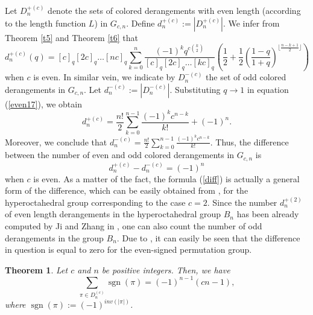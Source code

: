 \documentclass[a4paper,12pt]{article}
\newtheorem{thm}{Theorem}[section]
\begin{document}
Let $D_n^{+(c)}$ denote the sets of colored derangements with even length (according to the length function $L$) in $G_{c,n}$. Define $d_n^{+(c)}:=|D_n^{+(c)}|$. We infer from Theorem \ref{t5} and Theorem \ref{t6} that 
\begin{equation}\label{even17}
   d_n^{+(c)}(q)=[c]_q[2c]_q\dots [nc]_q \sum_{k=0}^n \frac{(-1)^k q^{c \binom{k}{2}}}{[c]_q[2c]_q\dots [kc]_q} \left( \frac{1}{2}+\frac{1}{2}\left( \frac{1-q}{1+q}\right)^{\lfloor{\frac{n-k+1}{2}}\rfloor}\right) 
\end{equation}
when $c$ is even. In similar vein, we indicate by $D_n^{-(c)}$ the set of odd colored derangements in $G_{c,n}$. Let $d_n^{-(c)}:=|D_n^{-(c)}|$. Substituting $q \rightarrow 1$ in equation (\ref{even17}), we obtain 
$$d_n^{+(c)}=\frac{n!}{2} \sum_{k=0}^{n-1} \frac{(-1)^k c^{n-k}}{k!} +(-1)^n.$$
Moreover, we conclude that $d_n^{-(c)}=\frac{n!}{2} \sum_{k=0}^{n-1} \frac{(-1)^k c^{n-k}}{k!}$. Thus, the difference between the number of even and odd colored derangements in $G_{c,n}$ is 
\begin{equation}\label{diff}
  d_n^{+(c)}-d_n^{-(c)}=(-1)^n  
\end{equation}
when $c$ is even. As a matter of the fact, the formula (\ref{diff}) is actually a general form of the difference, which can be easily obtained from \cite{ji2025}, for the hyperoctahedral group corresponding to the case $c=2$. Since the number $d_n^{+(2)}$ of even length derangements in the hyperoctahedral group $B_n$ has been already computed by Ji and Zhang in \cite{ji2025}, one can also count the number of odd derangements in the group $B_n$. Due to \cite{ji2025}, it can easily be seen that the difference in question is equal to zero for the even-signed permutation group.

\vspace{0.2cm}


\begin{thm} \label{drgmntsgn}
Let $c$ and $n$ be positive integers. Then, we have 
$$\sum_{\pi \in D_n^{(c)}} \operatorname{sgn}(\pi)=(-1)^{n-1}(cn-1),$$
where $\operatorname{sgn}(\pi):=(-1)^{inv(|\pi|)}$.
 \end{thm}
\end{document}

